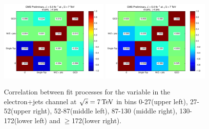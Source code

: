 \begin{figure}[hbtp]
	 \includegraphics[width=0.48\textwidth]{Chapters/04_Analysis/04b_XSections/images/fitchecks/7TeV/Correlations_electron_MET_130-172.pdf}\hfill
	 \includegraphics[width=0.48\textwidth]{Chapters/04_Analysis/04b_XSections/images/fitchecks/7TeV/Correlations_electron_MET_172-inf.pdf}\\
	 \caption[Correlation between fit processes for the \met variable in the electron+jets channel at
	 $\roots=7\TeV$.]{Correlation between fit processes for the \met variable in the electron+jets channel at
	 $\roots=7\TeV$ in bins 0-27\GeV (upper left), 27-52\GeV (upper right), 52-87\GeV (middle left), 87-130\GeV
	 (middle right), 130-172\GeV (lower left) and $\geq$172\GeV (lower right).}
     \label{fig:correlation_plots_7TeV_electron}
\end{figure}